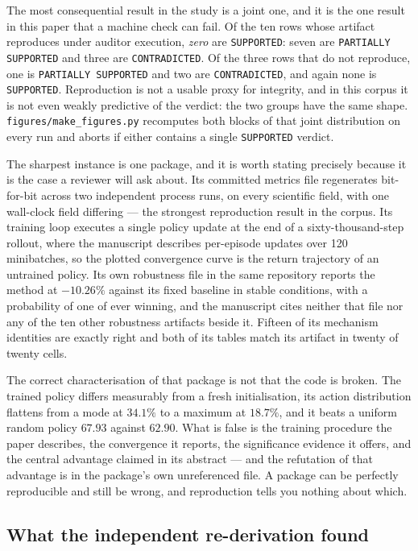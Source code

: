 \documentclass[sigconf,review]{acmart}
\begin{document}
The most consequential result in the study is a joint one, and it is the one
result in this paper that a machine check can fail. Of the ten rows whose
artifact reproduces under auditor execution, \emph{zero} are
\texttt{SUPPORTED}: seven are \texttt{PARTIALLY SUPPORTED} and three are
\texttt{CONTRADICTED}. Of the three rows that do not reproduce, one is
\texttt{PARTIALLY SUPPORTED} and two are \texttt{CONTRADICTED}, and again none
is \texttt{SUPPORTED}. Reproduction is not a usable proxy for integrity, and
in this corpus it is not even weakly predictive of the verdict: the two groups
have the same shape. \texttt{figures/make\_figures.py} recomputes both blocks
of that joint distribution on every run and aborts if either contains a single
\texttt{SUPPORTED} verdict.

The sharpest instance is one package, and it is worth stating precisely
because it is the case a reviewer will ask about. Its committed metrics file
regenerates bit-for-bit across two independent process runs, on every
scientific field, with one wall-clock field differing --- the strongest
reproduction result in the corpus. Its training loop executes a single policy
update at the end of a sixty-thousand-step rollout, where the manuscript
describes per-episode updates over 120 minibatches, so the plotted convergence
curve is the return trajectory of an untrained policy. Its own robustness file
in the same repository reports the method at $-10.26\%$ against its fixed
baseline in stable conditions, with a probability of one of ever winning, and
the manuscript cites neither that file nor any of the ten other robustness
artifacts beside it. Fifteen of its mechanism identities are exactly right and
both of its tables match its artifact in twenty of twenty cells.

The correct characterisation of that package is not that the code is broken.
The trained policy differs measurably from a fresh initialisation, its action
distribution flattens from a mode at $34.1\%$ to a maximum at $18.7\%$, and it
beats a uniform random policy $67.93$ against $62.90$. What is false is the
training procedure the paper describes, the convergence it reports, the
significance evidence it offers, and the central advantage claimed in its
abstract --- and the refutation of that advantage is in the package's own
unreferenced file. A package can be perfectly reproducible and still be wrong,
and reproduction tells you nothing about which.

\subsection{What the independent re-derivation found}
\label{sec:res-rederivation}
\end{document}

